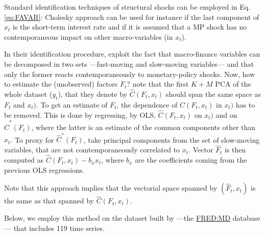 \documentclass[
  12pt,
]{book}
\theoremstyle{definition}
\theoremstyle{definition}
\theoremstyle{definition}
\theoremstyle{definition}
\theoremstyle{remark}
\begin{document}
Standard identification techniques of structural shocks can be employed in Eq. \eqref{eq:FAVAR}: Cholesky approach can be used for instance if the last component of \(x_t\) is the short-term interest rate and if it is assumed that a MP shock has no contemporaneous impact on other macro-variables (in \(x_t\)).

In their identification procedure, \citet{Bernanke_Boivin_Eliasz_2005} exploit the fact that macro-finance variables can be decomposed in two sets ---fast-moving and slow-moving variables--- and that only the former reacts contemporaneously to monetary-policy shocks. Now, how to estimate the (unobserved) factors \(F_t\)? \citet{Bernanke_Boivin_Eliasz_2005} note that the first \(K+M\) PCA of the whole dataset (\(y_t\)), that they denote by \(\hat{C}(F_t,x_t)\) should span the same space as \(F_t\) and \(x_t)\). To get an estimate of \(F_t\), the dependence of \(\hat{C}(F_t,x_t)\) in \(x_t)\) has to be removed. This is done by regressing, by OLS, \(\hat{C}(F_t,x_t)\) on \(x_t)\) and on \(\hat{C}^*(F_t)\), where the latter is an estimate of the common components other than \(x_t\). To proxy for \(\hat{C}^*(F_t)\), \citet{Bernanke_Boivin_Eliasz_2005} take principal components from the set of slow-moving variables, that are not comtemporaneously correlated to \(x_t\). Vector \(\hat{F}_t\) is then computed as \(\hat{C}(F_t,x_t) - b_x x_t\), where \(b_x\) are the coefficients coming from the previous OLS regressions.

Note that this approach implies that the vectorial space spanned by \((\hat{F}_t,x_t)\) is the same as that spanned by \(\hat{C}(F_t,x_t)\).

Below, we employ this method on the dataset built by \citet{McCracken_Ng_2016} ---the \href{https://research.stlouisfed.org/wp/more/2015-012}{FRED:MD} database--- that includes 119 time series.
\end{document}
